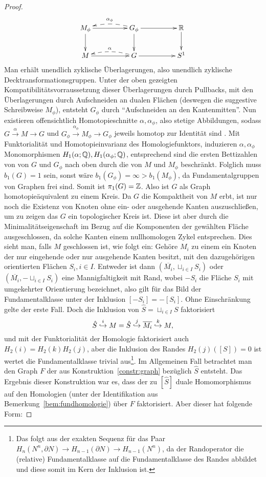 \begin{proof}
	\[
	 	\begin{xy}
	 		\xymatrixcolsep{4pc}\xymatrix{
	 			M_\phi \ar[r] \ar[d] & G_\phi \ar[d] \ar@{-->}@/_/[l]_{\alpha_\phi} \ar[r] & \RR \ar[d]\\
	 			M \ar[r] & G \ar@{-->}@/_/[l]_\alpha \ar[r] &S^1
	 		}
	 	\end{xy}
	 \] 
	 Man erhält unendlich zyklische Überlagerungen, also unendlich zyklische Decktransformationsgruppen. Unter der oben gezeigten Kompatibilitätsvorraussetzung dieser Überlagerungen durch Pullbacks, mit den Überlagerungen durch Aufschneiden an dualen Flächen (deswegen die suggestive Schreibweise $M_\phi$), entsteht $G_\phi$ durch "`Aufschneiden an den Kantenmitten"'. Nun existieren offensichtlich Homotopieschnitte $\alpha, \alpha_\phi$, also stetige Abbildungen, sodass $ G \stackrel \alpha \to M \to G$ und $ G_\phi \stackrel {\alpha_ \phi} \to M_\phi \to G_\phi$ jeweils homotop zur Identität sind . Mit Funktorialität und Homotopieinvarianz des Homologiefunktors, induzieren $\alpha,\alpha_\phi$ Monomorphismen $H_1(\alpha;\mathbb{Q}),H_1(\alpha_\phi;\mathbb{Q})$, entsprechend sind die ersten Bettizahlen von von $G$ und $G_\phi$ nach oben durch die von $M$ und $M_\phi$ beschränkt. Folglich muss $b_1(G)=1$ sein, sonst wäre $b_1(G_\phi)=\infty> b_1(M_\phi)$, da Fundamentalgruppen von Graphen frei sind. Somit ist $\pi_1(G)= \mathbb{Z}$. Also ist $G$ als Graph homotopieäquivalent zu einem Kreis. Da $G$ die Kompaktheit von $M$ erbt, ist nur noch die Existenz von Knoten ohne ein- oder ausgehende Kanten auszuschließen, um zu zeigen das $G$ ein topologischer Kreis ist. Diese ist aber durch die Minimalitätseigenschaft im Bezug auf die Komponenten der gewählten Fläche ausgeschlossen, da solche Kanten einem nullhomologen Zykel entsprechen. Dies sieht man, falls $M$ geschlossen ist, wie folgt ein: Gehöre $M_i$ zu einem ein Knoten der nur eingehende oder nur ausgehende Kanten besitzt, mit den dazugehörigen orientierten Flächen $S_i, i \in I$. Entweder ist dann $(\overline{M_i},\sqcup_{i\in I}S_i)$ oder $(\overline{M_i},-\sqcup_{i\in I}S_i)$ eine Mannigfaltigkeit mit Rand, wobei $-S_i$ die Fläche $S_i$ mit umgekehrter Orientierung bezeichnet, also gilt für das Bild der Fundamentalklasse unter der Inklusion $[-S_i]=-[S_i]$. Ohne Einschränkung gelte der erste Fall. Doch die Inklusion von $\hat S = \sqcup_{i \in I} S$ faktorisiert 
	 \[
	  \hat S \stackrel i {\hookrightarrow} M = \hat S \stackrel j {\hookrightarrow} \overline{M_i} \stackrel k {\hookrightarrow} M,	 	
	 \]
	 und mit der Funktorialität der Homologie faktorisiert auch $H_2(i)=H_2(k)H_2(j)$, aber die Inklusion des Randes $H_2(j)([S])=0$ ist wertet die Fundamentalklasse trivial aus\footnote{Das folgt aus der exakten Sequenz für das Paar $H_n(N^n, \partial N) \to H_{n-1}(\partial N) \to H_{n-1}(N^n)$, da der Randoperator die (relative) Fundamentalklasse auf die Fundamentalklasse des Randes abbildet und diese somit im Kern der Inklusion ist.}. Im Allgemeinen Fall betrachtet man den Graph $F$ der aus Konstruktion~\ref{constr:graph} bezüglich $\hat S$ entsteht. Das Ergebnis dieser Konstruktion war es, dass der zu $[\hat S]$ duale Homomorphismus auf den Homologien (unter der Identifikation aus Bemerkung~\ref{bem:fundhomologie}) über $F$ faktorisiert. Aber dieser hat folgende Form:

\end{proof}
